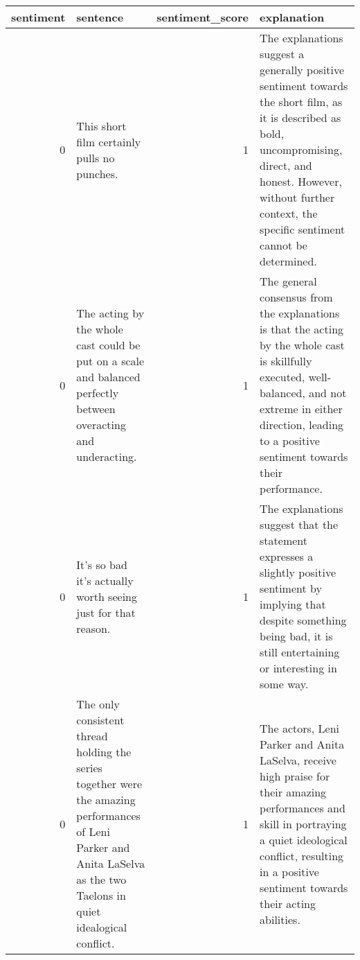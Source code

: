 \begin{tabular}{r{1cm} p{0.4in} r{1cm} p{0.4in}}
\toprule
sentiment & sentence & sentiment_score & explanation \\
\midrule
0 & This short film certainly pulls no punches. & 1 & The explanations suggest a generally positive sentiment towards the short film, as it is described as bold, uncompromising, direct, and honest. However, without further context, the specific sentiment cannot be determined. \\
0 & The acting by the whole cast could be put on a scale and balanced perfectly between overacting and underacting. & 1 & The general consensus from the explanations is that the acting by the whole cast is skillfully executed, well-balanced, and not extreme in either direction, leading to a positive sentiment towards their performance. \\
0 & It's so bad it's actually worth seeing just for that reason. & 1 & The explanations suggest that the statement expresses a slightly positive sentiment by implying that despite something being bad, it is still entertaining or interesting in some way. \\
0 & The only consistent thread holding the series together were the amazing performances of Leni Parker and Anita LaSelva as the two Taelons in quiet idealogical conflict. & 1 & The actors, Leni Parker and Anita LaSelva, receive high praise for their amazing performances and skill in portraying a quiet ideological conflict, resulting in a positive sentiment towards their acting abilities. \\
\bottomrule
\end{tabular}
